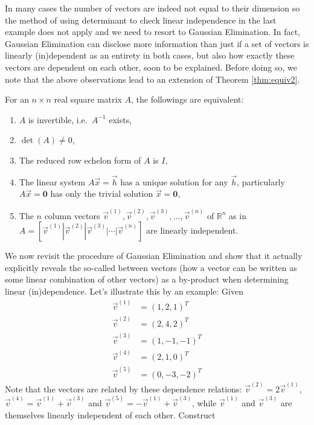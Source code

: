 In many cases the number of vectors are indeed not equal to their dimension so the method of using determinant to check linear independence in the last example does not apply and we need to resort to Gaussian Elimination. In fact, Gaussian Elimination can disclose more information than just if a set of vectors is linearly (in)dependent as an entirety in both cases, but also how exactly these vectors are dependent on each other, soon to be explained. Before doing so, we note that the above observations lead to an extension of Theorem \ref{thm:equiv2}.
\begin{thm}
\label{thm:equiv3}
For an $n \times n$ real square matrix $A$, the followings are equivalent:
\begin{enumerate}[label=(\alph*)]
\item $A$ is invertible, i.e.\ $A^{-1}$ exists,
\item $\det(A) \neq 0$,
\item The reduced row echelon form of $A$ is $I$,
\item The linear system $A\vec{x} = \vec{h}$ has a unique solution for any $\vec{h}$, particularly $A\vec{x} = \textbf{0}$ has only the trivial solution $\vec{x} = \textbf{0}$,
\item The $n$ column vectors $\vec{v}^{(1)}, \vec{v}^{(2)}, \vec{v}^{(3)}, \ldots, \vec{v}^{(n)}$ of $\mathbb{R}^n$ as in $A = [\vec{v}^{(1)}|\vec{v}^{(2)}|\vec{v}^{(3)}|\cdots|\vec{v}^{(n)}]$ are linearly independent.
\end{enumerate}
\end{thm}
We now revisit the procedure of Gaussian Elimination and show that it actually explicitly reveals the so-called  between vectors (how a vector can be written as some linear combination of other vectors) as a by-product when determining linear (in)dependence. Let's illustrate this by an example: Given
\begin{align*}
\vec{v}^{(1)} &= (1,2,1)^T \\
\vec{v}^{(2)} &= (2,4,2)^T \\
\vec{v}^{(3)} &= (1,-1,-1)^T \\
\vec{v}^{(4)} &= (2,1,0)^T \\
\vec{v}^{(5)} &= (0,-3,-2)^T
\end{align*}
Note that the vectors are related by these dependence relations: $\vec{v}^{(2)} = 2\vec{v}^{(1)}$, $\vec{v}^{(4)} = \vec{v}^{(1)} + \vec{v}^{(3)}$ and $\vec{v}^{(5)} = -\vec{v}^{(1)} + \vec{v}^{(3)}$, while $\vec{v}^{(1)}$ and $\vec{v}^{(3)}$ are  themselves linearly independent of each other. Construct 

